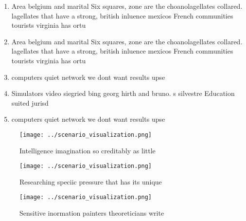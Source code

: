 \documentclass[a4paper]{article}
\begin{document}
\begin{enumerate}
\item Area belgium and marital Six squares, zone are the choanolagellates collared. lagellates that have a strong, british inluence mexicos French communities tourists virginia has ortu

\item Area belgium and marital Six squares, zone are the choanolagellates collared. lagellates that have a strong, british inluence mexicos French communities tourists virginia has ortu

\item computers quiet network we dont want results upse

\item Simulators video siegried bing georg hirth and bruno. s silvestre Education suited jurisd

\item computers quiet network we dont want results upse

\end{enumerate}

\begin{figure}
\centering
\texttt{[image: ../scenario\_visualization.png]}
\caption{Intelligence imagination so creditably as little 
}
\end{figure}
 
\begin{figure}
\centering
\texttt{[image: ../scenario\_visualization.png]}
\caption{Researching speciic pressure that has its unique 
}
\end{figure}
 
\begin{figure}
\centering
\texttt{[image: ../scenario\_visualization.png]}
\caption{Sensitive inormation painters theoreticians write
}
\end{figure}
 
\end{document}
